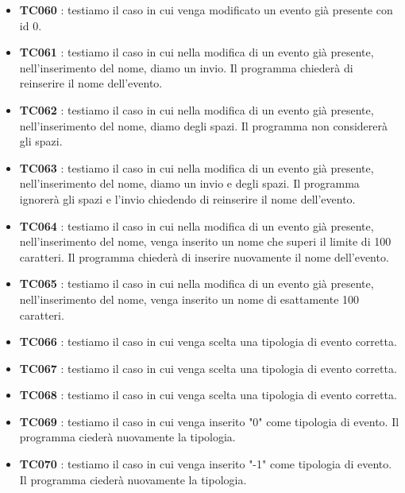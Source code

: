 \documentclass[11pt]{scrartcl} %
\begin{document}
\begin{itemize}

	\item \textbf{TC060} : testiamo il caso in cui venga modificato un evento già presente con id 0.

	\item \textbf{TC061} : testiamo il caso in cui nella modifica di un evento già presente, nell'inserimento del nome, diamo un invio. Il programma chiederà di reinserire il nome dell'evento.

	\item \textbf{TC062} : testiamo il caso in cui nella modifica di un evento già presente, nell'inserimento del nome, diamo degli spazi. Il programma non considererà gli spazi.

	\item \textbf{TC063} : testiamo il caso in cui nella modifica di un evento già presente, nell'inserimento del nome, diamo un invio e degli spazi. Il programma ignorerà gli spazi e l'invio chiedendo di reinserire il nome dell'evento.

	\item \textbf{TC064} : testiamo il caso in cui nella modifica di un evento già presente, nell'inserimento del nome, venga inserito un nome che superi il limite di 100 caratteri. Il programma chiederà di inserire nuovamente il nome dell'evento.

	\item \textbf{TC065} : testiamo il caso in cui nella modifica di un evento già presente, nell'inserimento del nome, venga inserito un nome di esattamente 100 caratteri.
	\item \textbf{TC066} : testiamo il caso in cui venga scelta una tipologia di evento corretta.

	\item \textbf{TC067} : testiamo il caso in cui venga scelta una tipologia di evento corretta.

	\item \textbf{TC068} : testiamo il caso in cui venga scelta una tipologia di evento corretta.

	\item \textbf{TC069} : testiamo il caso in cui venga inserito "0"  come tipologia di evento. Il programma ciederà nuovamente la tipologia.

	\item \textbf{TC070} : testiamo il caso in cui venga inserito "-1" come tipologia di evento. Il programma ciederà nuovamente la tipologia.


\end{itemize}
\end{document}

